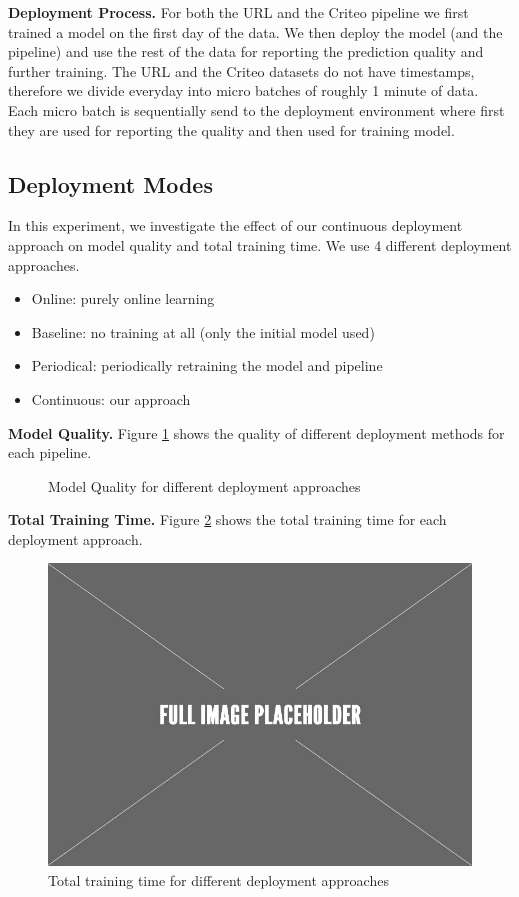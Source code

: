 \textbf{Deployment Process. }
For both the URL and the Criteo pipeline we first trained a model on the first day of the data.
We then deploy the model (and the pipeline) and use the rest of the data for reporting the prediction quality and further training.
The URL and the Criteo datasets do not have timestamps, therefore we divide everyday into micro batches of roughly 1 minute of data. 
Each micro batch is sequentially send to the deployment environment where first they are used for reporting the quality and then used for training model.

\subsection{Deployment Modes}
In this experiment, we investigate the effect of our continuous deployment approach on model quality and total training time.
We use 4 different deployment approaches.
\begin{itemize}
\item Online: purely online learning
\item Baseline: no training at all (only the initial model used)
\item Periodical: periodically retraining the model and pipeline
\item Continuous: our approach
\end{itemize}

\textbf{Model Quality. }
Figure \ref{deployment-quality-figure} shows the quality of different deployment methods for each pipeline.

\begin{figure}
\centering
\resizebox{\columnwidth}{!}{}
\caption{Model Quality for different deployment approaches}
\label{deployment-quality-figure}
\end{figure}

\textbf{Total Training Time. }
Figure \ref{deployment-time-figure} shows the total training time for each deployment approach.

\begin{figure}
\centering
\includegraphics[width=\columnwidth]{../images/placeholder.jpeg}
\caption{Total training time for different deployment approaches}
\label{deployment-time-figure}
\end{figure}

